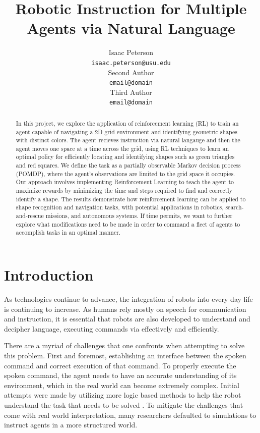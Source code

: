 \documentclass[11pt]{article}
\title{Robotic Instruction for Multiple Agents via Natural Language}
\author{Isaac Peterson \\
  \texttt{isaac.peterson@usu.edu} \\\And
  Second Author \\
  \texttt{email@domain} \\\And 
  Third Author \\
  \texttt{email@domain} 
  }
\begin{document}
\maketitle
\begin{abstract}
  In this project, we explore the application of reinforcement learning (RL) to train an agent capable of navigating a 2D grid environment and identifying geometric shapes with distinct colors. The agent recieves instruction via natural langauge and then the agent moves one space at a time across the grid, using RL techniques to learn an optimal policy for efficiently locating and identifying shapes such as green triangles and red squares. We define the task as a partially observable Markov decision process (POMDP), where the agent's observations are limited to the grid space it occupies. Our approach involves implementing Reinforcement Learning to teach the agent to maximize rewards by minimizing the time and steps required to find and correctly identify a shape. The results demonstrate how reinforcement learning can be applied to shape recognition and navigation tasks, with potential applications in robotics, search-and-rescue missions, and autonomous systems. If time permits, we want to further explore what modifications need to be made in order to command a fleet of agents to accomplish tasks in an optimal manner.

\end{abstract}

\section{Introduction}
As technologies continue to advance, the integration of robots into every day life is continuing to increase. As humans rely mostly on speech for communication and instruction, it is essential that robots are also developed to understand and decipher language, executing commands via effectively and efficiently. 

There are a myriad of challenges that one confronts when attempting to solve this problem. First and foremost, establishing an interface between the spoken command and correct execution of that command. To properly execute the spoken command, the agent needs to have an accurate understanding of its environment, which in the real world can become extremely complex. Initial attempts were made by utilizing more logic based methods to help the robot understand the task that needs to be solved \cite{Liu2016}. To mitigate the challenges that come with real world interpretation, many researchers defaulted to simulations to instruct agents in a more structured world.
\end{document}

